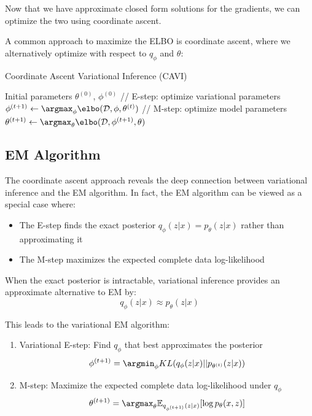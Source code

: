   Now that we have approximate closed form solutions for the gradients, we can optimize the two using coordinate ascent. 

  \begin{algo}
    A common approach to maximize the ELBO is coordinate ascent, where we alternatively optimize with respect to $q_\phi$ and $\theta$:

    \begin{algorithm}[H]
      \caption{Coordinate Ascent Variational Inference (CAVI)}
      \begin{algorithmic}[1]
        \Require Initial parameters $\theta^{(0)}$, $\phi^{(0)}$
          \State // E-step: optimize variational parameters
          \State $\phi^{(t+1)} \gets \argmax_\phi \elbo(\mathcal{D}, \phi, \theta^{(t)})$
          \State // M-step: optimize model parameters
          \State $\theta^{(t+1)} \gets \argmax_\theta \elbo(\mathcal{D}, \phi^{(t+1)}, \theta)$
        \EndWhile
      \end{algorithmic}
    \end{algorithm}
  \end{algo}
  
\subsection{EM Algorithm}

  The coordinate ascent approach reveals the deep connection between variational inference and the EM algorithm. In fact, the EM algorithm can be viewed as a special case where:

  \begin{itemize}
    \item The E-step finds the exact posterior $q_\phi(z|x) = p_\theta(z|x)$ rather than approximating it
    \item The M-step maximizes the expected complete data log-likelihood
  \end{itemize}

  When the exact posterior is intractable, variational inference provides an approximate alternative to EM by:
  \begin{equation}
    q_\phi(z|x) \approx p_\theta(z|x)
  \end{equation}

  This leads to the variational EM algorithm:

  \begin{enumerate}
    \item Variational E-step: Find $q_\phi$ that best approximates the posterior
    \begin{equation}
      \phi^{(t+1)} = \argmin_\phi KL(q_\phi(z|x) || p_{\theta^{(t)}}(z|x))
    \end{equation}
    
    \item M-step: Maximize the expected complete data log-likelihood under $q_\phi$
    \begin{equation}
      \theta^{(t+1)} = \argmax_\theta \mathbb{E}_{q_{\phi^{(t+1)}}(z|x)}[\log p_\theta(x,z)]
    \end{equation}
  \end{enumerate}


